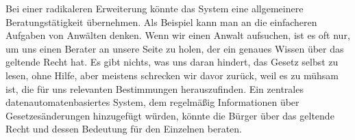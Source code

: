 {Bei einer radikaleren Erweiterung könnte das System eine allgemeinere Beratungstätigkeit übernehmen. Als Beispiel kann man an die einfacheren Aufgaben von Anwälten denken. Wenn wir einen Anwalt aufsuchen, ist es oft nur, um uns einen Berater an unsere Seite zu holen, der ein genaues Wissen über das geltende Recht hat. Es gibt nichts, was uns daran hindert, das Gesetz selbst zu lesen, ohne Hilfe, aber meistens schrecken wir davor zurück, weil es zu mühsam ist, die für uns relevanten Bestimmungen herauszufinden. Ein zentrales datenautomatenbasiertes System, dem regelmäßig Informationen über Gesetzesänderungen hinzugefügt würden, könnte die Bürger über das geltende Recht und dessen Bedeutung für den Einzelnen beraten.
}


